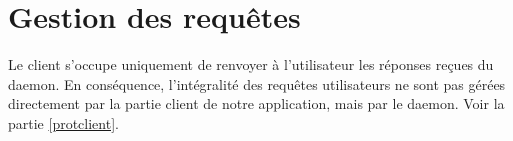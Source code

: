 	\section{Gestion des requ\^etes}

Le client s'occupe uniquement de renvoyer à l'utilisateur les réponses reçues
du daemon. En conséquence, l'intégralité des requêtes utilisateurs ne sont pas 
gérées directement par la partie client de notre application, mais par le 
daemon. Voir la partie \ref{protclient}.
	
